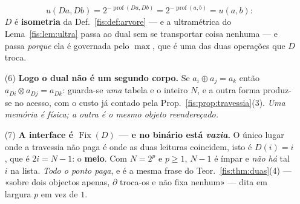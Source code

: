 \documentclass[livro.tex]{subfiles}
\begin{document}
\begin{teorema}
\begin{enumerate}
\[
u(Da,Db)=2^{-\operatorname{prof}(Da,Db)}=2^{-\operatorname{prof}(a,b)}=u(a,b):
\]
$D$ é \textbf{isometria} da Def.~\ref{fis:def:arvore} --- e a ultramétrica do
Lema~\ref{fis:lem:ultra} passa ao dual sem se transportar coisa nenhuma --- e
passa \emph{porque} ela é governada pelo $\max$, que é uma das duas operações que
$D$ troca.
\item[(6)] \textbf{Logo o dual não é um segundo corpo.} Se $a_i\oplus a_j=a_k$
então $a_{Di}\otimes a_{Dj}=a_{Dk}$: guarda-se \emph{uma} tabela e o inteiro $N$,
e a outra forma produz-se no acesso, com o custo já contado pela
Prop.~\ref{fis:prop:travessia}(3). \emph{Uma memória é física; a outra é o mesmo
objeto reendereçado.}
\item[(7)] \textbf{A interface é $\operatorname{Fix}(D)$ --- e no binário está
\emph{vazia}.} O único lugar onde a travessia não paga é onde as duas leituras
coincidem, isto é $D(i)=i$, que é $2i=N-1$: o \textbf{meio}. Com $N=2^{p}$ e
$p\ge1$, $N-1$ é ímpar e \emph{não há} tal $i$ na lista. \emph{Todo o ponto paga},
e é a mesma frase do Teor.~\ref{fis:thm:duas}(4) --- «sobre dois objectos apenas,
$\partial$ troca-os e não fixa nenhum» --- dita em largura $p$ em vez de $1$.
\end{enumerate}
\end{teorema}
\end{document}
